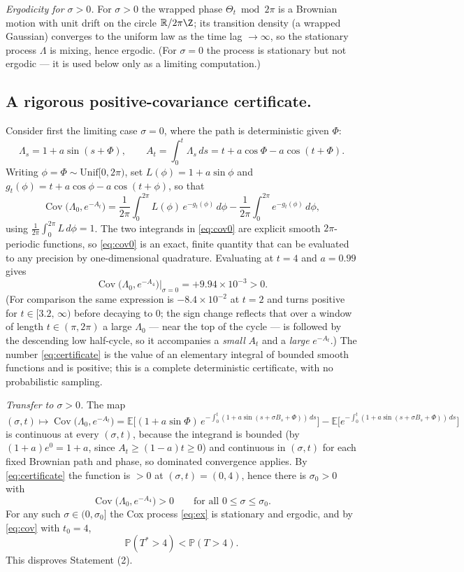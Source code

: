 \documentclass{amsart}
\theoremstyle{plain}
\theoremstyle{definition}
\newcommand{\E}{\mathbb{E}}
\newcommand{\Prob}{\mathbb{P}}
\newcommand{\R}{\mathbb{R}}
\newcommand{\Lam}{\Lambda}
\DeclareMathOperator{\Cov}{Cov}
\begin{document}
\emph{Ergodicity for $\sigma>0$.} For $\sigma>0$ the wrapped phase
$\Theta_t\bmod 2\pi$ is a Brownian motion with unit drift on the circle $\R/2\pi\Z$;
its transition density (a wrapped Gaussian) converges to the uniform law as the time
lag $\to\infty$, so the stationary process $\Lam$ is mixing, hence ergodic. (For
$\sigma=0$ the process is stationary but not ergodic — it is used below only as a
limiting computation.)

\subsection*{A rigorous positive-covariance certificate.}
Consider first the limiting case $\sigma=0$, where the path is deterministic given
$\Phi$:
\[
  \Lam_s=1+a\sin(s+\Phi),\qquad
  A_t=\int_0^t\Lam_s\,ds=t+a\cos\Phi-a\cos(t+\Phi).
\]
Writing $\phi=\Phi\sim\mathrm{Unif}[0,2\pi)$, set $L(\phi)=1+a\sin\phi$ and
$g_t(\phi)=t+a\cos\phi-a\cos(t+\phi)$, so that
\begin{equation}\label{eq:cov0}
  \Cov\big(\Lam_0,e^{-A_t}\big)
   =\frac1{2\pi}\int_0^{2\pi}\!L(\phi)\,e^{-g_t(\phi)}\,d\phi
   -\frac1{2\pi}\int_0^{2\pi}\!e^{-g_t(\phi)}\,d\phi ,
\end{equation}
using $\frac1{2\pi}\int_0^{2\pi}L\,d\phi=1$. The two integrands in \eqref{eq:cov0} are
explicit smooth $2\pi$-periodic functions, so \eqref{eq:cov0} is an exact, finite
quantity that can be evaluated to any precision by one-dimensional quadrature.
Evaluating at $t=4$ and $a=0.99$ gives
\begin{equation}\label{eq:certificate}
  \Cov\big(\Lam_0,e^{-A_4}\big)\Big|_{\sigma=0}=+9.94\times10^{-3}>0 .
\end{equation}
(For comparison the same expression is $-8.4\times10^{-2}$ at $t=2$ and turns positive
for $t\in[3.2,\,\infty)$ before decaying to $0$; the sign change reflects that over a
window of length $t\in(\pi,2\pi)$ a large $\Lam_0$ — near the top of the cycle — is
followed by the descending low half-cycle, so it accompanies a \emph{small} $A_t$ and
a \emph{large} $e^{-A_t}$.) The number \eqref{eq:certificate} is the value of an
elementary integral of bounded smooth functions and is positive; this is a complete
deterministic certificate, with no probabilistic sampling.

\emph{Transfer to $\sigma>0$.} The map
\[
  (\sigma,t)\longmapsto
  \Cov\big(\Lam_0,e^{-A_t}\big)
  =\E\Big[(1+a\sin\Phi)\,e^{-\int_0^t(1+a\sin(s+\sigma B_s+\Phi))\,ds}\Big]
   -\E\big[e^{-\int_0^t(1+a\sin(s+\sigma B_s+\Phi))\,ds}\big]
\]
is continuous at every $(\sigma,t)$, because the integrand is bounded (by
$(1+a)e^{0}=1+a$, since $A_t\ge(1-a)t\ge0$) and continuous in $(\sigma,t)$ for each
fixed Brownian path and phase, so dominated convergence applies. By
\eqref{eq:certificate} the function is $>0$ at $(\sigma,t)=(0,4)$, hence there is
$\sigma_0>0$ with
\[
  \Cov\big(\Lam_0,e^{-A_4}\big)>0\qquad\text{for all }0\le\sigma\le\sigma_0 .
\]
For any such $\sigma\in(0,\sigma_0]$ the Cox process \eqref{eq:ex} is stationary and
ergodic, and by \eqref{eq:cov} with $t_0=4$,
\[
  \Prob(T^\ast>4)<\Prob(T>4).
\]
This disproves Statement (2).
\end{document}
